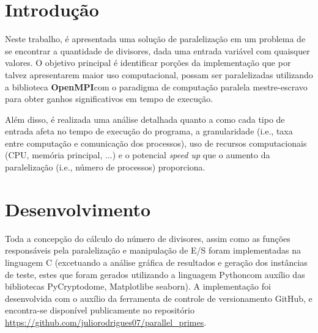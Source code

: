 \documentclass[a4paper, 12pt]{article}
\begin{document}
\tableofcontents
\newpage
\section{Introdução}

Neste trabalho, é apresentada uma solução de paralelização em um problema de se encontrar a quantidade de divisores, dada uma entrada variável com quaisquer valores. O objetivo principal é identificar porções da implementação que por talvez apresentarem maior uso computacional, possam ser paralelizadas utilizando a biblioteca \textbf{OpenMPI}\footnotemark \hspace{0.1cm}com o paradigma de computação paralela mestre-escravo para obter ganhos significativos em tempo de execução.


Além disso, é realizada uma análise detalhada quanto a como cada tipo de entrada afeta no tempo de execução do programa, a granularidade (i.e., taxa entre computação e comunicação dos processos), uso de recursos computacionais (CPU, memória principal, ...) e o potencial \emph{speed up} que o aumento da paralelização (i.e., número de processos) proporciona.

\section{Desenvolvimento}

Toda a concepção do cálculo do número de divisores, assim como as funções responsáveis pela paralelização e manipulação de E/S foram implementadas na linguagem C (excetuando a análise gráfica de resultados e geração dos instâncias de teste, estes que foram gerados utilizando a linguagem Python\footnotemark \hspace{0.1cm}com auxílio das bibliotecas PyCryptodome\footnotemark, Matplotlib\footnotemark \hspace{0.1cm}e seaborn\footnotemark). A implementação foi desenvolvida com o auxílio da ferramenta de controle de versionamento GitHub\footnotemark, e encontra-se disponível publicamente no repositório \url{https://github.com/juliorodrigues07/parallel_primes}.

\end{document}
